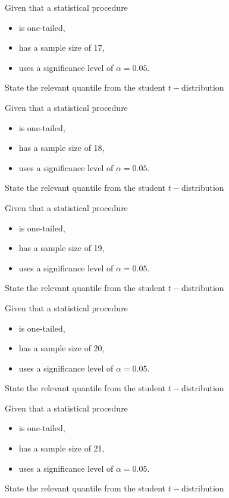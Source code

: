 \documentclass[12pt, a4paper]{report}
\theoremstyle{definition}
\theoremstyle{remark}
\begin{document}
	
	
	
	Given that a statistical procedure 
	\begin{itemize}
		\item is one-tailed,
		\item has a sample size of 17,
		\item uses a significance level of $\alpha = 0.05$.
	\end{itemize} \smallskip
	State the relevant quantile from the student $t-$distribution
	


	
	
	
	Given that a statistical procedure
	\begin{itemize}
		\item is one-tailed,
		\item has a sample size of 18,
		\item uses a significance level of $\alpha = 0.05$.
	\end{itemize} \smallskip
	State the relevant quantile from the student $t-$distribution
	


	
	
	
	Given that a statistical procedure 
	\begin{itemize}
		\item is one-tailed,
		\item has a sample size of 19,
		\item uses a significance level of $\alpha = 0.05$.
	\end{itemize} \smallskip
	State the relevant quantile from the student $t-$distribution
	


	
	
	
	Given that a statistical procedure 
	\begin{itemize}
		\item is one-tailed,
		\item has a sample size of 20,
		\item uses a significance level of $\alpha = 0.05$.
	\end{itemize} \smallskip
	State the relevant quantile from the student $t-$distribution
	


	
	
	
	Given that a statistical procedure
	\begin{itemize}
		\item is one-tailed,
		\item has a sample size of 21,
		\item uses a significance level of $\alpha = 0.05$.
	\end{itemize} \smallskip
	State the relevant quantile from the student $t-$distribution
	
\end{document}
